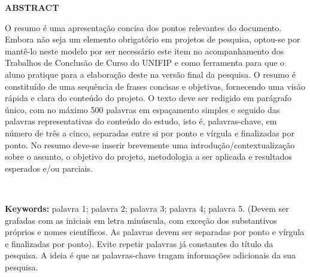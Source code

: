 \thispagestyle{empty}

\singlespacing
\begin{center}
	\textbf{ABSTRACT}
\end{center}

\noindent O resumo é uma apresentação concisa dos pontos relevantes do documento. Embora não seja um elemento obrigatório em projetos de pesquisa, optou-se por mantê-lo neste modelo por ser necessário este item no acompanhamento dos Trabalhos de Conclusão de Curso do UNIFIP e como ferramenta para que o aluno pratique para a elaboração deste na versão final da pesquisa. O resumo é constituído de uma sequência de frases concisas e objetivas, fornecendo uma visão rápida e clara do conteúdo do projeto. O texto deve ser redigido em parágrafo único, com no máximo 500 palavras em espaçamento simples e seguido das palavras representativas do conteúdo do estudo, isto é, palavras-chave, em número de três a cinco, separadas entre si por ponto e vírgula e finalizadas por ponto. No resumo deve-se inserir brevemente uma introdução/contextualização sobre o assunto, o objetivo do projeto, metodologia a ser aplicada e resultados esperados e/ou parciais.

\ \

\noindent \textbf{Keywords:} palavra 1; palavra 2; palavra 3; palavra 4; palavra 5. (Devem ser grafadas com as iniciais em letra minúscula, com exceção dos substantivos próprios e nomes científicos. As palavras devem ser separadas por ponto e vírgula e finalizadas por ponto). Evite repetir palavras já constantes do título da pesquisa. A ideia é que as palavras-chave tragam informações adicionais da sua pesquisa.
\newpage